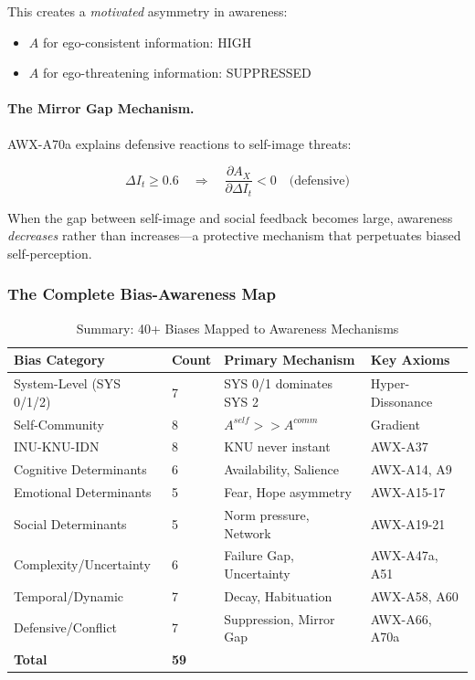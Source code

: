 This creates a \emph{motivated} asymmetry in awareness:
\begin{itemize}
\item $A$ for ego-consistent information: HIGH
\item $A$ for ego-threatening information: SUPPRESSED
\end{itemize}

\paragraph{The Mirror Gap Mechanism.}
AWX-A70a explains defensive reactions to self-image threats:

\begin{equation}
\Delta I_t \geq 0.6 \quad \Rightarrow \quad \frac{\partial A_X}{\partial \Delta I_t} < 0 \quad \text{(defensive)}
\end{equation}

When the gap between self-image and social feedback becomes large,
awareness \emph{decreases} rather than increases---a protective mechanism
that perpetuates biased self-perception.

\subsubsection{The Complete Bias-Awareness Map}

\begin{table}[htbp]
\centering
\caption{Summary: 40+ Biases Mapped to Awareness Mechanisms}
\label{tab:complete-bias-map}
\small
\renewcommand{\arraystretch}{1.2}
\begin{tabular}{@{}llll@{}}
\toprule
\textbf{Bias Category} & \textbf{Count} & \textbf{Primary Mechanism} & \textbf{Key Axioms} \\
\midrule
System-Level (SYS 0/1/2) & 7 & SYS 0/1 dominates SYS 2 & Hyper-Dissonance \\
Self-Community & 8 & $A^{self} >> A^{comm}$ & Gradient \\
INU-KNU-IDN & 8 & KNU never instant & AWX-A37 \\
Cognitive Determinants & 6 & Availability, Salience & AWX-A14, A9 \\
Emotional Determinants & 5 & Fear, Hope asymmetry & AWX-A15-17 \\
Social Determinants & 5 & Norm pressure, Network & AWX-A19-21 \\
Complexity/Uncertainty & 6 & Failure Gap, Uncertainty & AWX-A47a, A51 \\
Temporal/Dynamic & 7 & Decay, Habituation & AWX-A58, A60 \\
Defensive/Conflict & 7 & Suppression, Mirror Gap & AWX-A66, A70a \\
\midrule
\textbf{Total} & \textbf{59} & & \\
\bottomrule
\end{tabular}
\end{table}


